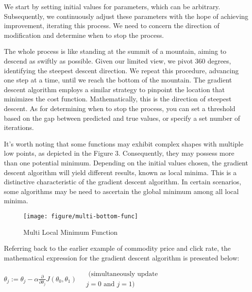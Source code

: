 \documentclass{article}
\begin{document}
We start by setting initial values for parameters, which can be arbitrary. Subsequently, we continuously adjust these parameters with the hope of achieving improvement, iterating this process. We need to concern the direction of modification and determine when to stop the process.

The whole process is like standing at the summit of a mountain, aiming to descend as swiftly as possible. Given our limited view, we pivot 360 degrees, identifying the steepest descent direction. We repeat this procedure, advancing one step at a time, until we reach the bottom of the mountain. The gradient descent algorithm employs a similar strategy to pinpoint the location that minimizes the cost function. Mathematically, this is the direction of steepest descent. As for determining when to stop the process, you can set a threshold based on the gap between predicted and true values, or specify a set number of iterations.

It's worth noting that some functions may exhibit complex shapes with multiple low points, as depicted in the Figure 3. Consequently, they may possess more than one potential minimum. Depending on the initial values chosen, the gradient descent algorithm will yield different results, known as local minima. This is a distinctive characteristic of the gradient descent algorithm. In certain scenarios, some algorithms may be need to ascertain the global minimum among all local minima.


    \begin{figure}[htbp]
        \centering
        \texttt{[image: figure/multi-bottom-func]}
        \caption{Multi Local Minimum Function}
     \end{figure}


    Referring back to the earlier example of commodity price and click rate, the mathematical expression for the gradient descent algorithm is presented below:

    \hspace*{\fill}

    $\theta_j:=\theta_j-\alpha \frac{\partial}{\partial \theta_j} J\left(\theta_0, \theta_1\right) \quad \begin{gathered}\text { (simultaneously update } \\ j=0 \text { and } j=1)\end{gathered}$

    \hspace*{\fill}
\end{document}
